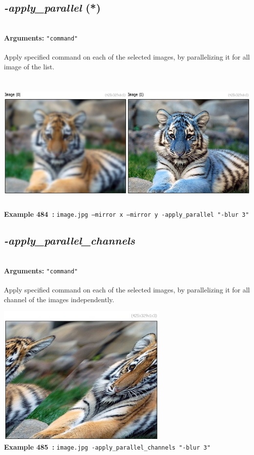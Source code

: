 \documentclass[a4paper,11pt,twoside]{book}
\begin{document}
\subsection{\emph{-apply\_parallel} (*)}\vspace*{-0.5em}
~\\\textbf{Arguments: } 
{\small \texttt{"command"}}\\~\\
Apply specified command on each of the selected images, by parallelizing it for all image of the list.
\begin{center}\includegraphics[keepaspectratio=true,height=7cm,width=\textwidth]{img/gmic_def484.jpg}\\
{\footnotesize \textbf{Example 484~:} \texttt{image.jpg --mirror x --mirror y -apply\_parallel "-blur 3"}}
\end{center}

\subsection{\emph{-apply\_parallel\_channels} }\vspace*{-0.5em}
~\\\textbf{Arguments: } 
{\small \texttt{"command"}}\\~\\
Apply specified command on each of the selected images, by parallelizing it for all channel of the images independently.
\begin{center}\includegraphics[keepaspectratio=true,height=7cm,width=\textwidth]{img/gmic_def485.jpg}\\
{\footnotesize \textbf{Example 485~:} \texttt{image.jpg -apply\_parallel\_channels "-blur 3"}}
\end{center}
\end{document}
